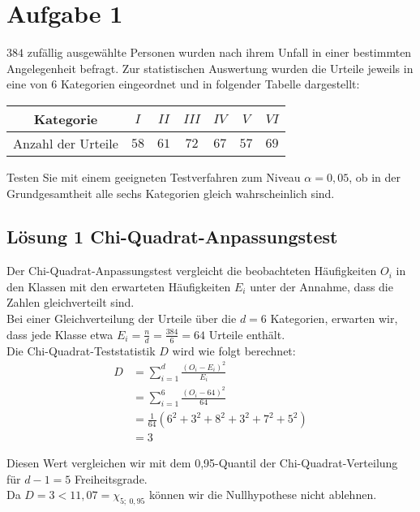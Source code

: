 \documentclass[main.tex]{subfiles}
\begin{document}
\section{Aufgabe 1}
$384$ zufällig ausgewählte Personen wurden nach ihrem Unfall in einer bestimmten Angelegenheit befragt. Zur statistischen Auswertung wurden die Urteile jeweils in eine von $6$ Kategorien eingeordnet und in folgender Tabelle dargestellt:
\begin{center}
\begin{tabular}{c|c|c|c|c|c|c}
	Kategorie & $I$ & $II$ & $III$ & $IV$ & $V$ & $VI$ \\ \hline
	Anzahl der Urteile & $58$ & $61$ & $72$ & $67$ & $57$ & $69$
\end{tabular}
\end{center}
Testen Sie mit einem geeigneten Testverfahren zum Niveau $\alpha = 0,05$, ob in der Grundgesamtheit alle sechs Kategorien gleich wahrscheinlich sind.

\subsection{Lösung 1 Chi-Quadrat-Anpassungstest}
Der Chi-Quadrat-Anpassungstest vergleicht die beobachteten Häufigkeiten $O_i$ in den Klassen mit den erwarteten Häufigkeiten $E_i$ unter der Annahme, dass die Zahlen gleichverteilt sind.\\

Bei einer Gleichverteilung der Urteile über die $d=6$ Kategorien, erwarten wir, dass jede Klasse etwa $E_i = \frac{n}{d} = \frac{384}{6} = 64$ Urteile enthält.\\

Die Chi-Quadrat-Teststatistik $D$ wird wie folgt berechnet:
$$\begin{aligned}
	D &= \sum_{i=1}^{d} \frac{(O_i - E_i)^2}{E_i} \\
	&= \sum_{i=1}^6 \frac{(O_i - 64)^2}{64} \\
	&= \frac{1}{64} \left( 6^2 +3^2 + 8^2 + 3^2 + 7^2 + 5^2 \right)\\
	&= 3
\end{aligned}$$

Diesen Wert vergleichen wir mit dem 0,95-Quantil der Chi-Quadrat-Verteilung für $d-1=5$ Freiheitsgrade.\\

Da $D = 3 < 11,07 = \chi_{5;\ 0,95}$ können wir die Nullhypothese nicht ablehnen.
\end{document}
